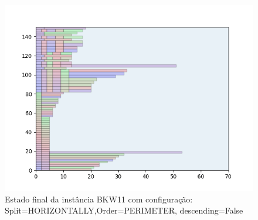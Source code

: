 \begin{figure}[H]
    \centering
    \caption[]{Estado final da instância BKW11 com configuração: Split=HORIZONTALLY,Order=PERIMETER, descending=False}
    \label{fig:bkw11-horizontally-perimeter-false}
    \includegraphics[scale=0.5]{output/figures/bkw/bkw11/horizontally/perimeter/false/000}
\end{figure}